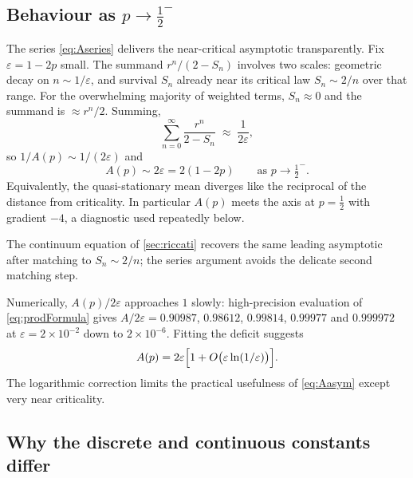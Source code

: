 \subsection{Behaviour as \texorpdfstring{$p\to\tfrac12^-$}{p to 1/2}}
\label{sec:asymptotic}

The series \cref{eq:Aseries} delivers the near-critical asymptotic transparently. Fix \(\varepsilon=1-2p\) small. The summand \(r^n/(2-S_n)\) involves two scales: geometric decay on \(n\sim1/\varepsilon\), and survival \(S_n\) already near its critical law \(S_n\sim2/n\) over that range. For the overwhelming majority of weighted terms, \(S_n\approx0\) and the summand is \(\approx r^n/2\). Summing,
\begin{equation*}
\sum_{n=0}^{\infty}\frac{r^n}{2-S_n} \;\approx\; \frac{1}{2\varepsilon},
\end{equation*}
so \(1/A(p)\sim1/(2\varepsilon)\) and
\begin{equation}
\label{eq:Aasym}
\boxed{\;A(p) \sim 2\varepsilon = 2(1-2p)\qquad\text{as } p\to\tfrac12^-.\;}
\end{equation}
Equivalently, the quasi-stationary mean diverges like the reciprocal of the distance from criticality. In particular \(A(p)\) meets the axis at \(p=\tfrac12\) with gradient \(-4\), a diagnostic used repeatedly below.

The continuum equation of \cref{sec:riccati} recovers the same leading asymptotic after matching to \(S_n\sim2/n\); the series argument avoids the delicate second matching step.

\begin{remark}
\label{rem:rate}
Numerically, \(A(p)/2\varepsilon\) approaches \(1\) slowly: high-precision evaluation of \cref{eq:prodFormula} gives \(A/2\varepsilon = 0.90987\), \(0.98612\), \(0.99814\), \(0.99977\) and \(0.999972\) at \(\varepsilon = 2\times10^{-2}\) down to \(2\times10^{-6}\). Fitting the deficit suggests
\begin{equation*}
A(p) = 2\varepsilon\Bigl[1+O\bigl(\varepsilon\ln(1/\varepsilon)\bigr)\Bigr].
\end{equation*}
The logarithmic correction limits the practical usefulness of \cref{eq:Aasym} except very near criticality.
\end{remark}

\subsection{Why the discrete and continuous constants differ}
\label{sec:compare}

